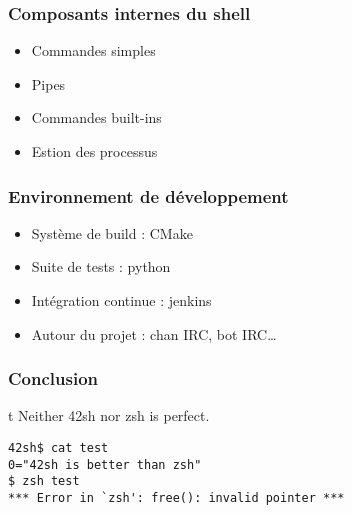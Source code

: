 \documentclass{beamer}
\begin{document}
\begin{frame}
    \frametitle{Composants internes du shell}
    \begin{itemize}
        \item Commandes simples
        \item Pipes
        \item Commandes built-ins
        \item Estion des processus
    \end{itemize}
\end{frame}

\begin{frame}
    \frametitle{Environnement de développement}
    \begin{itemize}
        \item Système de build : CMake
        \item Suite de tests : python
        \item Intégration continue : jenkins
        \item Autour du projet : chan IRC, bot IRC\dots
    \end{itemize}
\end{frame}

\begin{frame} [fragile]
    \frametitle{Conclusion}
t 
    Neither 42sh nor zsh is perfect.
\begin{verbatim}
42sh$ cat test
0="42sh is better than zsh"
$ zsh test
*** Error in `zsh': free(): invalid pointer ***
\end{verbatim}
\end{frame}
\end{document}
